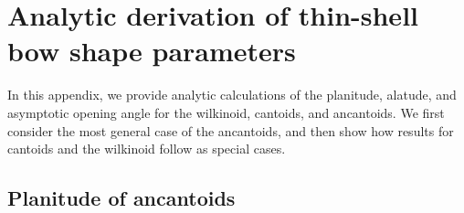 \section{Analytic derivation of thin-shell bow shape parameters}
\label{sec:thin-shell-shapes}

In this appendix, we provide analytic calculations of the planitude,
alatude, and asymptotic opening angle for the wilkinoid, cantoids, and
ancantoids.  We first consider the most general case of the
ancantoids, and then show how results for cantoids and the wilkinoid
follow as special cases.

\subsection{Planitude of ancantoids}
\label{sec:ancantoid-planitude}

